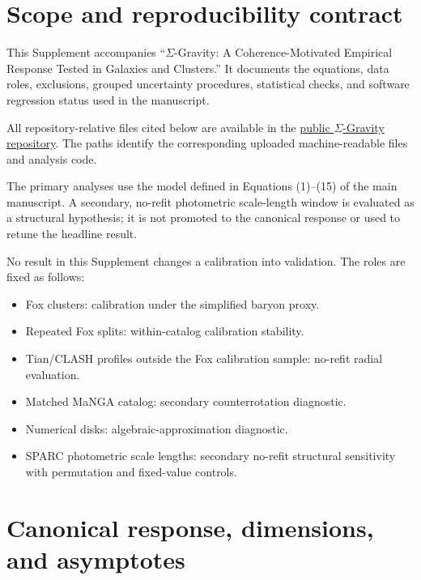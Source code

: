 \documentclass[utf8]{frontiers_suppmat}
\providecommand{\tightlist}{}
\begin{document}
\onecolumn
{}
\title[Supplementary Material]{{}}
\maketitle

\section{Scope and reproducibility contract}\label{s1.-scope-and-reproducibility-contract}

This Supplement accompanies ``\(\Sigma\)-Gravity: A Coherence-Motivated Empirical Response Tested in Galaxies and Clusters.'' It documents the equations, data roles, exclusions, grouped uncertainty procedures, statistical checks, and software regression status used in the manuscript.

All repository-relative files cited below are available in the \href{https://github.com/lrspeiser/sigmagravity}{public \(\Sigma\)-Gravity repository}. The paths identify the corresponding uploaded machine-readable files and analysis code.

The primary analyses use the model defined in Equations (1)--(15) of the main manuscript. A secondary, no-refit photometric scale-length window is evaluated as a structural hypothesis; it is not promoted to the canonical response or used to retune the headline result.

No result in this Supplement changes a calibration into validation. The roles are fixed as follows:

\begin{itemize}
\tightlist
\item
  Fox clusters: calibration under the simplified baryon proxy.
\item
  Repeated Fox splits: within-catalog calibration stability.
\item
  Tian/CLASH profiles outside the Fox calibration sample: no-refit radial evaluation.
\item
  Matched MaNGA catalog: secondary counterrotation diagnostic.
\item
  Numerical disks: algebraic-approximation diagnostic.
\item
  SPARC photometric scale lengths: secondary no-refit structural sensitivity with permutation and fixed-value controls.
\end{itemize}

\section{Canonical response, dimensions, and asymptotes}\label{s2.-canonical-response-dimensions-and-asymptotes}
\end{document}
